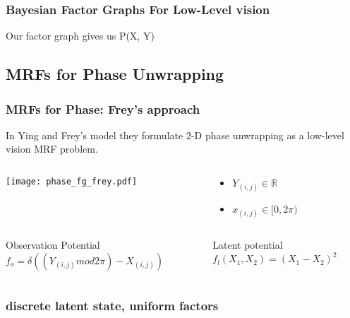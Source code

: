 \documentclass{beamer}
\begin{document}
\begin{frame}
\frametitle{Bayesian Factor Graphs For Low-Level vision}
Our factor graph gives us P(X, Y) 

\end{frame}

\subsection{MRFs for Phase Unwrapping}

\begin{frame} 
  \frametitle{MRFs for Phase: Frey's approach}
  In Ying and Frey's model \cite{lei_ying_unwrapping_2006} they formulate 2-D phase
  unwrapping as a low-level vision MRF problem. 
  
  \begin{columns}
    \begin{column}{5cm}
      \texttt{[image: phase\_fg\_frey.pdf]}
    \end{column}
    \begin{column}{5cm}
      \begin{itemize}
      \item $Y_{(i, j)} \in \mathbb{R}$
      \item $x_{(i, j)} \in [0, 2\pi)$
      \end{itemize}
    \end{column}
  \end{columns}
  
  
  \begin{columns}
    \begin{column}{5cm}
      \begin{block}{Observation Potential}
        $f_o = \delta ((Y_{(i, j)} mod 2\pi) - X_{(i, j)})$
      \end{block}
    \end{column}

    \begin{column}{5cm}
      \begin{block}{Latent potential} 
        $f_l(X_1, X_2) = (X_1 - X_2)^2$
      \end{block}
    \end{column}
    
  \end{columns}
  
\end{frame}

\begin{frame}
  \frametitle{discrete latent state, uniform factors}
\end{frame}
\end{document}
